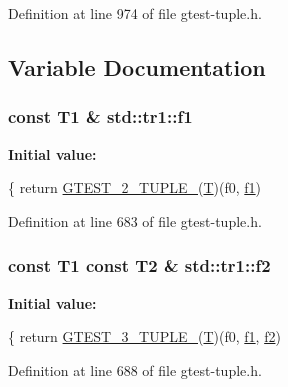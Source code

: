 Definition at line 974 of file gtest-\/tuple.\+h.



\subsection{Variable Documentation}
\subsubsection[{\texorpdfstring{f1}{f1}}]{\setlength{\rightskip}{0pt plus 5cm}const T1 \& std\+::tr1\+::f1}\hypertarget{namespacestd_1_1tr1_a9c0fa65b105f8e2f58ba59ecf75fd000}{}\label{namespacestd_1_1tr1_a9c0fa65b105f8e2f58ba59ecf75fd000}
{\bfseries Initial value\+:}
\begin{DoxyCode}
\{
  \textcolor{keywordflow}{return} \hyperlink{gtest-tuple_8h_a93229c3f009273c73eca237b4d19f326}{GTEST\_2\_TUPLE\_}(\hyperlink{all__17_8js_adf1f3edb9115acb0a1e04209b7a9937b}{T})(f0, \hyperlink{namespacestd_1_1tr1_a9c0fa65b105f8e2f58ba59ecf75fd000}{f1})
\end{DoxyCode}


Definition at line 683 of file gtest-\/tuple.\+h.

\subsubsection[{\texorpdfstring{f2}{f2}}]{\setlength{\rightskip}{0pt plus 5cm}const T1 const T2 \& std\+::tr1\+::f2}\hypertarget{namespacestd_1_1tr1_a87dd9e009868361317f587126dba63d4}{}\label{namespacestd_1_1tr1_a87dd9e009868361317f587126dba63d4}
{\bfseries Initial value\+:}
\begin{DoxyCode}
\{
  \textcolor{keywordflow}{return} \hyperlink{gtest-tuple_8h_af2c3eab3f1a5197b408fce44eb3ed9da}{GTEST\_3\_TUPLE\_}(\hyperlink{all__17_8js_adf1f3edb9115acb0a1e04209b7a9937b}{T})(f0, \hyperlink{namespacestd_1_1tr1_a9c0fa65b105f8e2f58ba59ecf75fd000}{f1}, \hyperlink{namespacestd_1_1tr1_a87dd9e009868361317f587126dba63d4}{f2})
\end{DoxyCode}


Definition at line 688 of file gtest-\/tuple.\+h.

